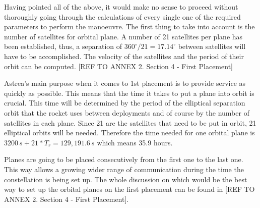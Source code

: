 Having pointed all of the above, it would make no sense to proceed without thoroughly going through the calculations of every single one of the required parameters to perform the manoeuvre. The first thing to take into account is the number of satellites for orbital plane. A number of 21 satellites per plane has been established, thus, a separation of $360^\circ/21 = 17.14^\circ$ between satellites will have to be accomplished. The velocity of the satellites and the period of their orbit can be computed. [{REF TO ANNEX 2. Section 4 - First Placement}]

Astrea's main purpose when it comes to 1st placement is to provide service as quickly as possible. This means that the time it takes to put a plane into orbit is crucial. This time will be determined by the period of the elliptical separation orbit that the rocket uses between deployments and of course by the number of satellites in each plane. Since 21 are the satellites that need to be put in orbit, 21 elliptical orbits will be needed. Therefore the time needed for one orbital plane is $3200\,s + 21*T_r = 129,191.6\,s$ which means 35.9 hours.

Planes are going to be placed consecutively from the first one to the last one. This way allows a growing wider range of communication during the time the constellation is being set up. The whole discussion on which would be the best way to set up the orbital planes on the first placement can be found in  [{REF TO ANNEX 2. Section 4 - First Placement}].